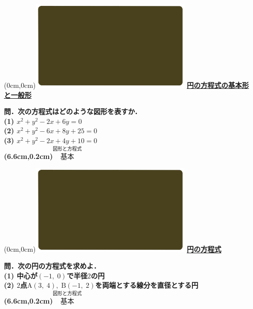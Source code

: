 \documentclass[10pt,
fleqn,
dvipdfmx,
uplatex
]{jsarticle}
\begin{document}
\at(0cm,0cm){\includegraphics[width=8cm,bb=0 0 1920 1080]{./youtube/thumbnails/templates/smart_background/図形と方程式.jpeg}}
{\color{orange}\bf\boldmath\Large\underline{円の方程式の基本形と一般形}}\vspace{0.3zw}

\large 
\bf\boldmath 問．次の方程式はどのような図形を表すか．\\
(1)  $x^2+y^2-2x+6y=0$\\
(2)  $x^2+y^2-6x+8y+{25}=0$\\
(3)  $x^2+y^2-2x+4y+{10}=0$\\

\at(6.6cm,0.2cm){\small\color{bradorange}$\overset{\text{図形と方程式}}{\text{基本}}$}


\newpage



\at(0cm,0cm){\includegraphics[width=8cm,bb=0 0 1920 1080]{./youtube/thumbnails/templates/smart_background/図形と方程式.jpeg}}
{\color{orange}\bf\boldmath\huge\underline{円の方程式}}\vspace{0.3zw}

\large 
\bf\boldmath 問．次の円の方程式を求めよ．\\
(1)  中心が$\left(-1,\;0\right)$で半径$2$の円\\
(2)  $2$点$\text{A}\left(3,\;4\right),\;\text{B}\left(-1,\;2\right)$を両端とする線分を直径とする円\\

\at(6.6cm,0.2cm){\small\color{bradorange}$\overset{\text{図形と方程式}}{\text{基本}}$}


\newpage
\end{document}
